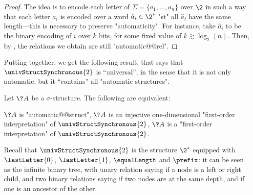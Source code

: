 \begin{proof}
	The idea is to encode each letter of $\Sigma = \{a_1,\hdots,a_n\}$
	over $\2$ in such a way that each letter $a_i$
	is encoded over a word $\hat a_i \in \2^*$ "st"
	all $\hat a_i$ have the same length---this is necessary to preserve "automaticity".
	For instance, take $\hat a_i$ to be the binary encoding of $i$
	over $k$ bits, for some fixed value of $k \gtrsim \log_2(n)$.
	Then, by ,
	the relations we obtain are still "automatic@@rel".
\end{proof}

Putting 
together, we get the following result, that says that $\univStructSynchronous{2}$ is ``universal'',
in the sense that it is not only automatic, but it ``contains'' all "automatic structures".
\begin{proposition}
	\AP\label{prop:universal-automatic-structure}
	Let $\?A$ be a $\sigma$-structure. The following are equivalent:
	\begin{enumerate}
		\itemAP\label{item:universal-automatic-structure-auto}
			$\?A$ is "automatic@@struct",
		\itemAP\label{item:universal-automatic-structure-injective-FO}
			$\?A$ is an injective one-dimensional "first-order interpretation" of
			$\univStructSynchronous{2}$,
		\itemAP\label{item:universal-automatic-structure-FO}
			$\?A$ is a "first-order interpretation" of $\univStructSynchronous{2}$.
	\end{enumerate}
\end{proposition}

Recall that $\univStructSynchronous{2}$ is the structure $\2^*$ equipped
with $\lastLetter{0}$, $\lastLetter{1}$, $\equalLength$ and $\prefix$: it can be
seen as the infinite binary tree, with unary relation saying if a node is a
left or right child, and two binary relations saying if two nodes are
at the same depth, and if one is an ancestor of the other.

